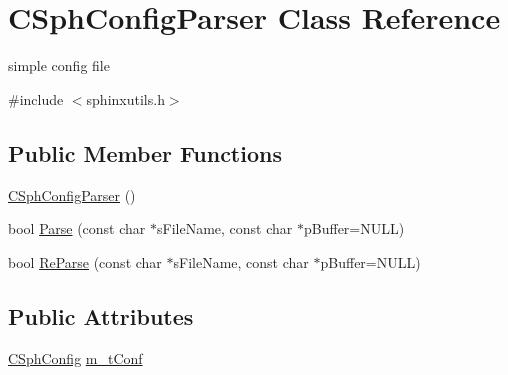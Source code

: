 \hypertarget{classCSphConfigParser}{\section{C\-Sph\-Config\-Parser Class Reference}
\label{classCSphConfigParser}
}


simple config file  




{\ttfamily \#include $<$sphinxutils.\-h$>$}

\subsection*{Public Member Functions}
\begin{DoxyCompactItemize}
\item 
\hyperlink{classCSphConfigParser_a25849060d3d1bbcde1aacc8c1ff96903}{C\-Sph\-Config\-Parser} ()
\item 
bool \hyperlink{classCSphConfigParser_a670e9a4000689588d41feb015e0d16a6}{Parse} (const char $\ast$s\-File\-Name, const char $\ast$p\-Buffer=N\-U\-L\-L)
\item 
bool \hyperlink{classCSphConfigParser_ac4b575e059fb61ed9c0039bb9a82ee72}{Re\-Parse} (const char $\ast$s\-File\-Name, const char $\ast$p\-Buffer=N\-U\-L\-L)
\end{DoxyCompactItemize}
\subsection*{Public Attributes}
\begin{DoxyCompactItemize}
\item 
\hyperlink{sphinxutils_8h_a48ca2d6437aae9aaa279d7993e6ade56}{C\-Sph\-Config} \hyperlink{classCSphConfigParser_a6221f2ed1927dd73b0f01469a9985097}{m\-\_\-t\-Conf}
\end{DoxyCompactItemize}
